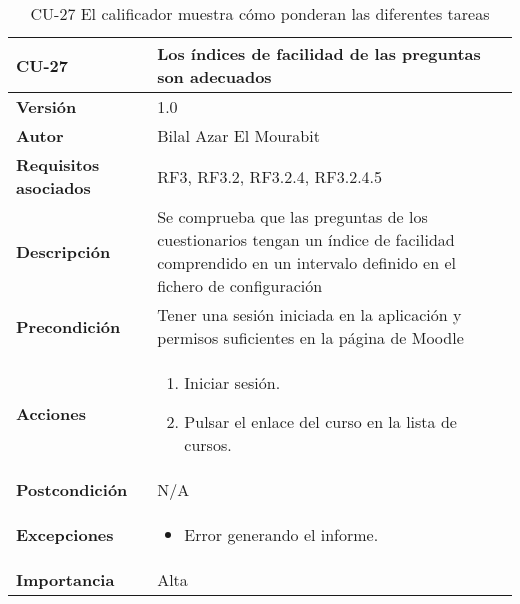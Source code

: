 \begin{table}[H]
	\centering
	\begin{tabularx}{\linewidth}{ p{} p{} }
		\toprule
		\textbf{CU-27}    & \textbf{Los índices de facilidad de las preguntas son adecuados}\\
		\toprule
		\textbf{Versión}              & 1.0    \\
		\textbf{Autor}                & Bilal Azar El Mourabit \\
		\textbf{Requisitos asociados} & RF3, RF3.2, RF3.2.4, RF3.2.4.5 \\
		\textbf{Descripción}          & Se comprueba que las preguntas de los cuestionarios tengan un índice de facilidad comprendido en un intervalo definido en el fichero de configuración\\
    		\textbf{Precondición}         & Tener una sesión iniciada en la aplicación y permisos suficientes en la página de Moodle\\
		\textbf{Acciones}             & 
		\begin{enumerate}
			\def\labelenumi{\arabic{enumi}.}
			\tightlist
			\item Iniciar sesión.
            \item Pulsar el enlace del curso en la lista de cursos. 
		\end{enumerate}\\
		\textbf{Postcondición}        & N/A \\
		\textbf{Excepciones}          & \begin{itemize}
		    \item Error generando el informe.
		\end{itemize} \\
		\textbf{Importancia}          & Alta \\
		\bottomrule
	\end{tabularx}
	\caption{CU-27 El calificador muestra cómo ponderan las diferentes tareas}
\end{table}


